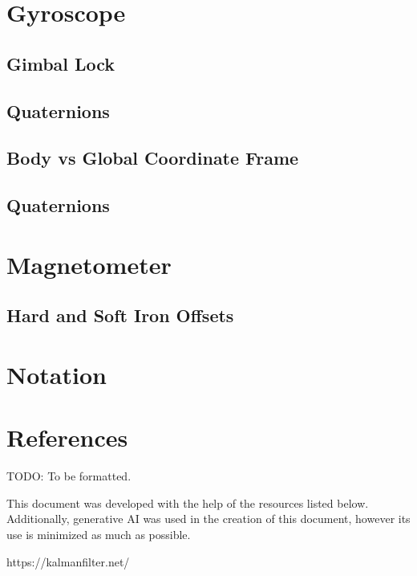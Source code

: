 \documentclass{article}
\begin{document}
\section{Gyroscope}

\subsection{Gimbal Lock}

\subsection{Quaternions}

\subsection{Body vs Global Coordinate Frame}

\subsection{Quaternions}

\section{Magnetometer}

\subsection{Hard and Soft Iron Offsets}

\section{Notation}

\section{References}

TODO: To be formatted.

This document was developed with the help of the resources listed below. Additionally, generative AI was used in the creation of this document, however its use is minimized as much as possible.

https://kalmanfilter.net/
\end{document}
